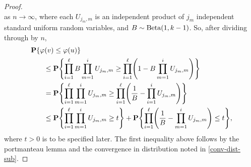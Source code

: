 \begin{proof}
\begin{equation}
  \end{equation}
  as $n \to \infty$, where each $U_{j_m, m}$ is an independent product
  of $j_m$ independent standard uniform random variables, and
  $B \sim \operatorname{Beta}(1, k - 1)$. So, after dividing through by $n$,
  \begin{align}
    &\Pr\{\varphi(v) \le \varphi(u)\} \eqlabel{failure-prob-v-r} \\
 &\qquad \le \Pr\left\{ \prod_{i = 1}^\ell B \prod_{m = 1}^i U_{j_m, m} \ge \prod_{i = 1}^\ell \left(1 - B \prod_{m = 1}^i U_{j_m, m} \right) \right\}  \notag \\
                                     &\qquad = \Pr\left\{ \prod_{i = 1}^\ell \prod_{m = 1}^i U_{j_m, m} \ge \prod_{i = 1}^\ell \left(\frac{1}{B} - \prod_{i = 1}^i U_{j_m, m} \right) \right\} \notag \\
                                     &\qquad \le \Pr\left\{ \prod_{i = 1}^\ell \prod_{m = 1}^i U_{j_m, m} \ge t \right\} +
 \Pr\left\{ \prod_{i = 1}^\ell \left(\frac{1}{B} - \prod_{m = 1}^i U_{j_m, m} \right) \le t \right\} , \eqlabel{lhs-rhs}
  \end{align}
  where $t > 0$ is to be specified later. The first inequality above
  follows by the portmanteau lemma and the convergence in distribution
  noted in \eqref{conv-dist-sub}.


\end{proof}
